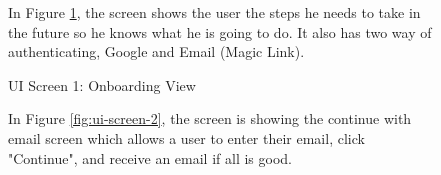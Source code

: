 \begin{figure}[!h]
\begin{minipage}{0.3\textwidth}
        \caption{UI Screen 1: Onboarding View}
        \label{fig:ui-screen-1}
    \end{minipage}
    \hfill
    \begin{minipage}{0.65\textwidth}
        In Figure \ref{fig:ui-screen-1}, the screen shows the user the steps he needs to take in the future so he knows what he is going to do. It also has two way of authenticating, Google and Email (Magic Link).
    \end{minipage}
\end{figure}

\begin{figure}[!h]
    \begin{minipage}{0.65\textwidth}
        In Figure \ref{fig:ui-screen-2}, the screen is showing the continue with email screen which allows a user to enter their email, click "Continue", and receive an email if all is good.
    \end{minipage}
    \hfill
    \begin{minipage}{0.3\textwidth}
        \centering

\end{minipage}
\end{figure}
